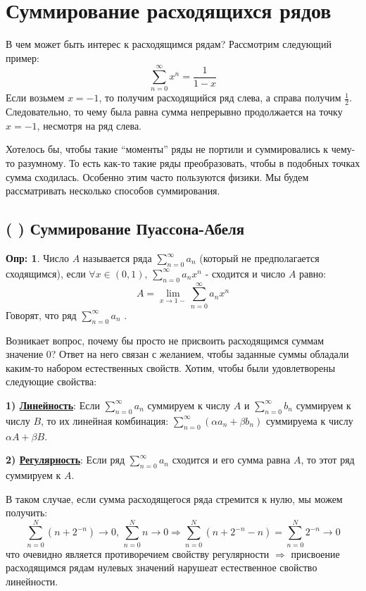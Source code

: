 \documentclass[12pt]{article}
\newcommand{\RN}[1]{%
	\textup{\uppercase\expandafter{\romannumeral#1}}%
}
\theoremstyle{definition}
\newtheorem{defn}{Опр:}
\newcommand{\ddsum}[2]{\displaystyle\sum\limits_{#1}^{#2}}
\begin{document}
\lhead{Математический анализ - \RN{3}}
\section*{Суммирование расходящихся рядов}
В чем может быть интерес к расходящимся рядам? Рассмотрим следующий пример:
$$
	\ddsum{n = 0}{\infty}x^n = \dfrac{1}{1-x}
$$
Если возьмем $x = -1$, то получим расходящийся ряд слева, а справа получим $\frac{1}{2}$. Следовательно, то чему была равна сумма непрерывно продолжается на точку $x = -1$, несмотря на ряд слева. 

Хотелось бы, чтобы такие ``моменты'' ряды не портили и суммировались к чему-то разумному. То есть как-то такие ряды преобразовать, чтобы в подобных точках сумма сходилась. Особенно этим часто пользуются физики. Мы будем рассматривать несколько способов суммирования.

\subsection*{(\RN{1}) Суммирование Пуассона-Абеля}
\begin{defn}
	Число $A$ называется  ряда $\ddsum{n = 0}{\infty}a_n$ (который не предполагается сходящимся), если $\forall x \in (0,1), \, \ddsum{n = 0}{\infty}a_n x^n$ - сходится и число $A$ равно: 
	$$
		A = \lim\limits_{x \to 1-}\ddsum{n = 0}{\infty}a_n x^n
	$$ 
	Говорят, что ряд $\ddsum{n = 0}{\infty}a_n$ .
\end{defn}
Возникает вопрос, почему бы просто не присвоить расходящимся суммам значение $0$? Ответ на него связан с желанием, чтобы заданные суммы обладали каким-то набором естественных свойств. Хотим, чтобы были удовлетворены следующие свойства:

\textbf{1) \uline{Линейность}}: Если $\ddsum{n = 0}{\infty}a_n$ суммируем к числу $A$ и $\ddsum{n = 0}{\infty}b_n$ суммируем к числу $B$, то их линейная комбинация: $\ddsum{n = 0}{\infty}(\alpha a_n + \beta b_n)$ суммируема к числу $\alpha A + \beta B$.

\textbf{2) \uline{Регулярность}}: Если ряд $\ddsum{n = 0}{\infty}a_n$ сходится и его сумма равна $A$, то этот ряд суммируем к $A$.

В таком случае, если сумма расходящегося ряда стремится к нулю, мы можем получить:
$$
	\ddsum{n = 0}{N}(n + 2^{-n}) \to 0, \, \ddsum{n = 0}{N}n \to 0 \Rightarrow \ddsum{n = 0}{N}(n + 2^{-n} - n) = \ddsum{n = 0}{N} 2^{-n} \to 0
$$
что очевидно является противоречием свойству регулярности $\Rightarrow$ присвоение расходящимся рядам нулевых значений нарушеат естественное свойство линейности.
\end{document}
